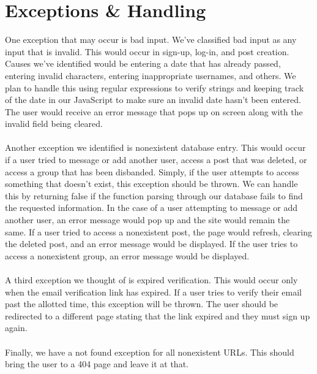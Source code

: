 \documentclass[a4paper]{article}
\begin{document}
\section{Exceptions \& Handling}
	One exception that may occur is bad input. We’ve classified bad input as any input that is invalid. This would occur in sign-up, log-in, and post creation. Causes we’ve identified would be entering a date that has already passed, entering invalid characters, entering inappropriate usernames, and others. We plan to handle this using regular expressions to verify strings and keeping track of the date in our JavaScript to make sure an invalid date hasn’t been entered. The user would receive an error message that pops up on screen along with the invalid field being cleared.\\
    \\
	Another exception we identified is nonexistent database entry. This would occur if a user tried to message or add another user, access a post that was deleted, or access a group that has been disbanded. Simply, if the user attempts to access something that doesn’t exist, this exception should be thrown. We can handle this by returning false if the function parsing through our database fails to find the requested information. In the case of a user attempting to message or add another user, an error message would pop up and the site would remain the same. If a user tried to access a nonexistent post, the page would refresh, clearing the deleted post, and an error message would be displayed. If the user tries to access a nonexistent group, an error message would be displayed.\\
    \\
	A third exception we thought of is expired verification. This would occur only when the email verification link has expired. If a user tries to verify their email past the allotted time, this exception will be thrown. The user should be redirected to a different page stating that the link expired and they must sign up again.\\
    \\
	Finally, we have a not found exception for all nonexistent URLs. This should bring the user to a 404 page and leave it at that.
    
\end{document}
